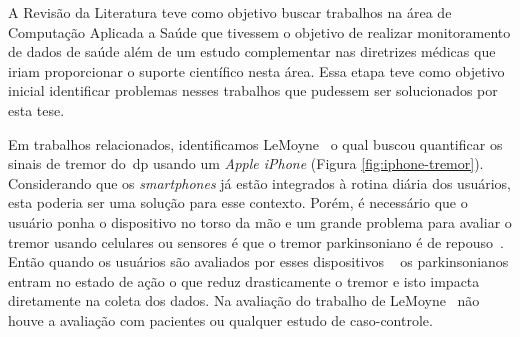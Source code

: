 A Revisão da Literatura teve como objetivo buscar trabalhos na área de Computação Aplicada a Saúde que tivessem o objetivo de realizar monitoramento de dados de saúde além de um estudo complementar nas diretrizes médicas que iriam proporcionar o suporte científico nesta área. Essa etapa teve como objetivo inicial identificar problemas nesses trabalhos que pudessem ser solucionados por esta tese.

Em trabalhos relacionados, identificamos LeMoyne~\cite{lemoyne2010} o qual buscou quantificar os sinais de tremor do~\ac{dp} usando um \textit{Apple iPhone} (Figura \ref{fig:iphone-tremor}). Considerando que os \textit{smartphones} já estão integrados à rotina diária dos usuários, esta poderia ser uma solução para esse contexto. Porém, é necessário que o usuário ponha o dispositivo no torso da mão e um grande problema para avaliar o tremor usando celulares ou sensores é que o tremor parkinsoniano é de repouso~\cite{jankovic2008}. Então quando os usuários são avaliados por esses dispositivos ~\cite{lemoyne2010,synnott_wiipd_2012} os parkinsonianos entram no estado de ação o que reduz drasticamente o tremor e isto impacta diretamente na coleta dos dados. Na avaliação do trabalho de LeMoyne~\cite{lemoyne2010} não houve a avaliação com pacientes ou qualquer estudo de caso-controle. %


